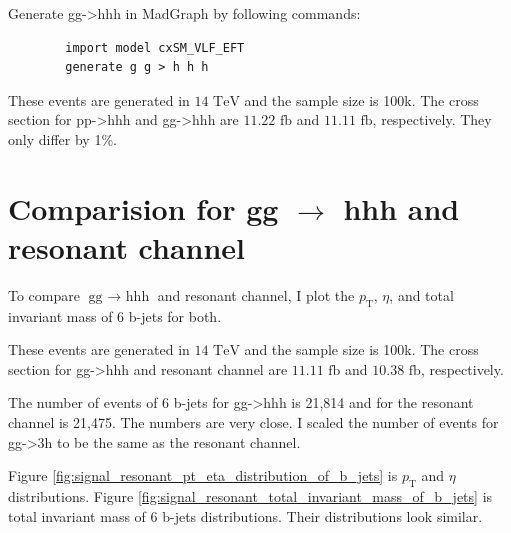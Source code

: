 \documentclass[12pt]{article}
\begin{document}
	Generate gg->hhh in MadGraph by following commands:
	\begin{verbatim}
		import model cxSM_VLF_EFT
		generate g g > h h h	
	\end{verbatim}

	These events are generated in $\text{14 TeV}$ and the sample size is 100k. The cross section for pp->hhh and gg->hhh are $\text{11.22 fb}$ and $\text{11.11 fb}$, respectively. They only differ by 1\%.
\section{Comparision for \texorpdfstring{gg $\to $ hhh}{gg to hhh} and resonant channel}%
\label{sec:comparision_for_gg_hhh_and_resonant_channel}
	To compare $\text{gg $\to $ hhh}$ and resonant channel, I plot the $p_\text{T}$, $\eta$, and total invariant mass of 6 b-jets for both.

	These events are generated in $\text{14 TeV}$ and the sample size is 100k. The cross section for gg->hhh and resonant channel are $\text{11.11 fb}$ and $\text{10.38 fb}$, respectively.

	The number of events of 6 b-jets for gg->hhh is 21,814 and for the resonant channel is 21,475. The numbers are very close. I scaled the number of events for gg->3h to be the same as the resonant channel.

	Figure \ref{fig:signal_resonant_pt_eta_distribution_of_b_jets} is $p_\text{T}$ and $\eta$ distributions. Figure \ref{fig:signal_resonant_total_invariant_mass_of_b_jets} is total invariant mass of 6 b-jets distributions. Their distributions look similar.
\end{document}
